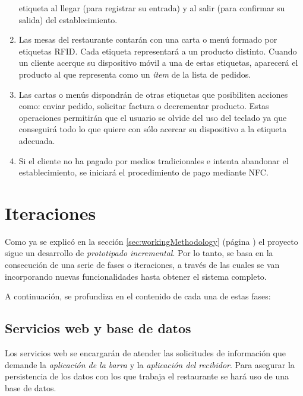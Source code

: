 \begin{enumerate}
etiqueta al llegar (para registrar su entrada) y al salir (para confirmar
su salida) del establecimiento.
\item Las mesas del restaurante contarán con una carta o menú formado por
etiquetas \acs{RFID}. Cada etiqueta representará a un producto distinto.
Cuando un cliente acerque su dispositivo móvil a una de estas etiquetas,
aparecerá el producto al que representa como un \emph{ítem} de la lista de
pedidos.
\item Las cartas o menús dispondrán de otras etiquetas que posibiliten acciones
como: enviar pedido, solicitar factura o decrementar producto. Estas
operaciones permitirán que el usuario se olvide del uso del teclado ya que
conseguirá todo lo que quiere con sólo acercar su dispositivo a la etiqueta
adecuada.
\item Si el cliente no ha pagado por medios tradicionales e intenta abandonar
el establecimiento, se iniciará el procedimiento de pago mediante \acs{NFC}.
\end{enumerate}

\section{Iteraciones}
Como ya se explicó en la sección \ref{sec:workingMethodology} (página
\pageref{sec:workingMethodology}) el proyecto sigue un desarrollo de
\emph{prototipado incremental}. Por lo tanto, se basa en la consecución de una
serie de fases o iteraciones, a través de las cuales se van incorporando nuevas
funcionalidades hasta obtener el sistema completo.

A continuación, se profundiza en el contenido de cada una de estas fases:

\subsection{Servicios web y base de datos}
Los servicios web se encargarán de atender las solicitudes de información que
demande la \emph{aplicación de la barra} y la \emph{aplicación del recibidor}.
Para asegurar la persistencia de los datos con los que trabaja el restaurante
se hará uso de una base de datos.

